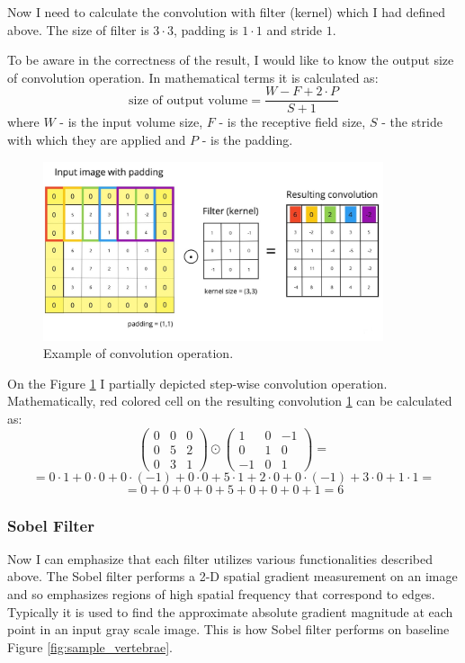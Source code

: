 Now I need to calculate the convolution with filter (kernel) which I had defined above. The size of filter is $3 \cdot 3$, padding is $1 \cdot 1$ and stride $1$.

To be aware in the correctness of the result, I would like to know the output size of convolution operation. In mathematical terms it is calculated as: \[ \text{size of output volume} = \frac{W-F+2 \cdot P}{S+1} \] where $W$ - is the input volume size, $F$ - is the receptive field size, $S$ - the stride with which they are applied and $P$ - is the padding.

\begin{figure}[h]
    \centering \includegraphics[width=10cm]{images/convolution_operation.jpeg}
    \caption {Example of convolution operation.}
    \label{fig:convolution}
\end{figure}

On the Figure \ref{fig:convolution} I partially depicted step-wise convolution operation. Mathematically, red colored cell on the resulting convolution \ref{fig:convolution} can be calculated as:    
\[ \begin{pmatrix} 0 & 0 & 0 \\ 0 & 5 & 2 \\ 0 & 3 & 1 \end{pmatrix} \odot \begin{pmatrix} 1 & 0 & -1 \\ 0 & 1 & 0 \\ -1 & 0 & 1 \end{pmatrix} = \]
\[ = 0 \cdot 1 + 0 \cdot 0 + 0 \cdot (-1) + 0 \cdot 0 + 5 \cdot 1 + 2 \cdot 0 + 0 \cdot (-1) + 3 \cdot 0 + 1 \cdot 1 = \] 
\[ = 0 + 0 + 0 + 0 + 5 + 0 + 0 + 0 + 1= 6 \]

\subsubsection{Sobel Filter}
Now I can emphasize that each filter utilizes various functionalities described above. The Sobel filter performs a 2-D spatial gradient measurement on an image and so emphasizes regions of high spatial frequency that correspond to edges. Typically it is used to find the approximate absolute gradient magnitude at each point in an input gray scale image. This is how Sobel filter performs on baseline Figure \ref{fig:sample_vertebrae}.

